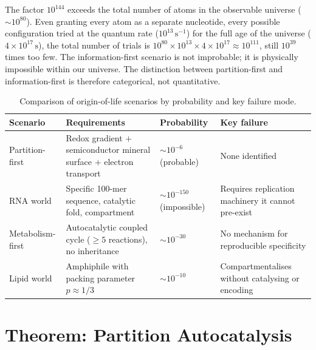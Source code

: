 \begin{remark}
The factor $10^{144}$ exceeds the total number of atoms in the observable
universe ($\sim 10^{80}$). Even granting every atom as a separate nucleotide,
every possible configuration tried at the quantum rate ($10^{13}\,\mathrm{s}^{-1}$)
for the full age of the universe ($4 \times 10^{17}\,\mathrm{s}$), the total
number of trials is $10^{80} \times 10^{13} \times 4 \times 10^{17} \approx 10^{111}$,
still $10^{39}$ times too few. The information-first scenario is not improbable;
it is physically impossible within our universe. The distinction between
partition-first and information-first is therefore categorical, not quantitative.
\end{remark}

\begin{table}[ht]
\centering
\caption{Comparison of origin-of-life scenarios by probability and key failure mode.}
\label{tab:origin_scenarios}
\begin{tabularx}{\textwidth}{l X X X}
\toprule
\textbf{Scenario} & \textbf{Requirements} & \textbf{Probability} & \textbf{Key failure} \\
\midrule
Partition-first
  & Redox gradient $+$ semiconductor mineral surface $+$ electron transport
  & $\sim 10^{-6}$ (probable)
  & None identified \\
\midrule
RNA world
  & Specific 100-mer sequence, catalytic fold, compartment
  & $\sim 10^{-150}$ (impossible)
  & Requires replication machinery it cannot pre-exist \\
\midrule
Metabolism-first
  & Autocatalytic coupled cycle ($\geq 5$ reactions), no inheritance
  & $\sim 10^{-30}$
  & No mechanism for reproducible specificity \\
\midrule
Lipid world
  & Amphiphile with packing parameter $p \approx 1/3$
  & $\sim 10^{-10}$
  & Compartmentalises without catalysing or encoding \\
\bottomrule
\end{tabularx}
\end{table}

\section{Theorem: Partition Autocatalysis}
\label{sec:autocatalysis}

